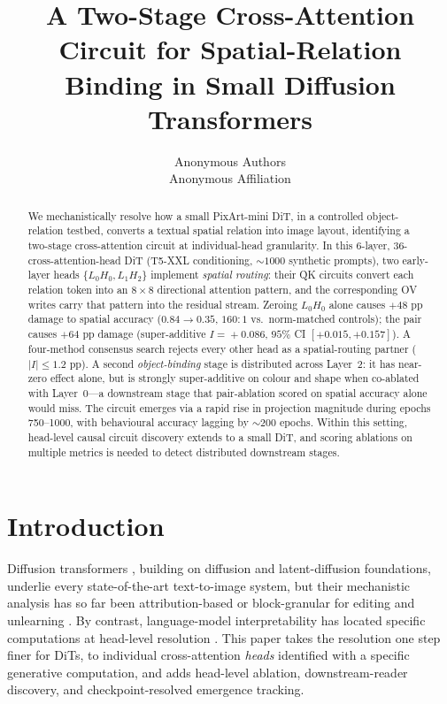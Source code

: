 \documentclass{article}
\title{A Two-Stage Cross-Attention Circuit for Spatial-Relation Binding in Small Diffusion Transformers}
\author{%
  Anonymous Authors \\
  Anonymous Affiliation \\
}
\begin{document}
\maketitle

\begin{abstract}
We mechanistically resolve how a small PixArt-mini DiT, in a controlled object-relation testbed, converts a textual spatial relation into image layout, identifying a two-stage cross-attention circuit at individual-head granularity. In this 6-layer, 36-cross-attention-head DiT (T5-XXL conditioning, $\sim\!1000$ synthetic prompts), two early-layer heads $\{L_0H_0, L_1H_2\}$ implement \emph{spatial routing}: their QK circuits convert each relation token into an $8\!\times\!8$ directional attention pattern, and the corresponding OV writes carry that pattern into the residual stream. Zeroing $L_0H_0$ alone causes $+48$ pp damage to spatial accuracy ($0.84\!\to\!0.35$, $160{:}1$ vs.\ norm-matched controls); the pair causes $+64$ pp damage (super-additive $I\!=\!+0.086$, $95\%$ CI $[+0.015,+0.157]$). A four-method consensus search rejects every other head as a spatial-routing partner ($|I|\!\leq\!1.2$ pp). A second \emph{object-binding} stage is distributed across Layer~2: it has near-zero effect alone, but is strongly super-additive on colour and shape when co-ablated with Layer~0---a downstream stage that pair-ablation scored on spatial accuracy alone would miss. The circuit emerges via a rapid rise in projection magnitude during epochs 750--1000, with behavioural accuracy lagging by $\sim\!200$ epochs. Within this setting, head-level causal circuit discovery extends to a small DiT, and scoring ablations on multiple metrics is needed to detect distributed downstream stages.
\end{abstract}


\section{Introduction}

Diffusion transformers \citep{peebles2023scalable,chen2024pixart}, building on diffusion \citep{ho2020denoising} and latent-diffusion \citep{rombach2022high} foundations, underlie every state-of-the-art text-to-image system, but their mechanistic analysis has so far been attribution-based \citep{helbling2025conceptattention,tang2023daam} or block-granular for editing and unlearning \citep{zarei2025localizing,basu2024localizing,orgad2023editing}. By contrast, language-model interpretability has located specific computations at head-level resolution \citep{wang2023interpretability,olsson2022induction,conmy2023acdc}. This paper takes the resolution one step finer for DiTs, to individual cross-attention \emph{heads} identified with a specific generative computation, and adds head-level ablation, downstream-reader discovery, and checkpoint-resolved emergence tracking.
\end{document}
